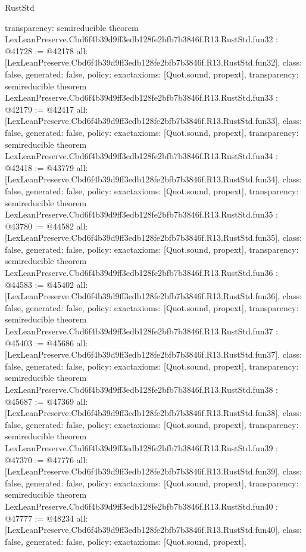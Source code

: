 \begin{lexlean}{RustStd}
\begin{coremodule}
{  transparency: semireducible
}
theorem LexLeanPreserve.Cbd6f4b39d9ff3edb128fe2bfb7b3846f.R13.RustStd.fun32 : @41728 := @42178 {
  all: [LexLeanPreserve.Cbd6f4b39d9ff3edb128fe2bfb7b3846f.R13.RustStd.fun32],
  class: false,
  generated: false,
  policy: exact{axioms: [Quot.sound, propext]},
  transparency: semireducible
}
theorem LexLeanPreserve.Cbd6f4b39d9ff3edb128fe2bfb7b3846f.R13.RustStd.fun33 : @42179 := @42417 {
  all: [LexLeanPreserve.Cbd6f4b39d9ff3edb128fe2bfb7b3846f.R13.RustStd.fun33],
  class: false,
  generated: false,
  policy: exact{axioms: [Quot.sound, propext]},
  transparency: semireducible
}
theorem LexLeanPreserve.Cbd6f4b39d9ff3edb128fe2bfb7b3846f.R13.RustStd.fun34 : @42418 := @43779 {
  all: [LexLeanPreserve.Cbd6f4b39d9ff3edb128fe2bfb7b3846f.R13.RustStd.fun34],
  class: false,
  generated: false,
  policy: exact{axioms: [Quot.sound, propext]},
  transparency: semireducible
}
theorem LexLeanPreserve.Cbd6f4b39d9ff3edb128fe2bfb7b3846f.R13.RustStd.fun35 : @43780 := @44582 {
  all: [LexLeanPreserve.Cbd6f4b39d9ff3edb128fe2bfb7b3846f.R13.RustStd.fun35],
  class: false,
  generated: false,
  policy: exact{axioms: [Quot.sound, propext]},
  transparency: semireducible
}
theorem LexLeanPreserve.Cbd6f4b39d9ff3edb128fe2bfb7b3846f.R13.RustStd.fun36 : @44583 := @45402 {
  all: [LexLeanPreserve.Cbd6f4b39d9ff3edb128fe2bfb7b3846f.R13.RustStd.fun36],
  class: false,
  generated: false,
  policy: exact{axioms: [Quot.sound, propext]},
  transparency: semireducible
}
theorem LexLeanPreserve.Cbd6f4b39d9ff3edb128fe2bfb7b3846f.R13.RustStd.fun37 : @45403 := @45686 {
  all: [LexLeanPreserve.Cbd6f4b39d9ff3edb128fe2bfb7b3846f.R13.RustStd.fun37],
  class: false,
  generated: false,
  policy: exact{axioms: [Quot.sound, propext]},
  transparency: semireducible
}
theorem LexLeanPreserve.Cbd6f4b39d9ff3edb128fe2bfb7b3846f.R13.RustStd.fun38 : @45687 := @47369 {
  all: [LexLeanPreserve.Cbd6f4b39d9ff3edb128fe2bfb7b3846f.R13.RustStd.fun38],
  class: false,
  generated: false,
  policy: exact{axioms: [Quot.sound, propext]},
  transparency: semireducible
}
theorem LexLeanPreserve.Cbd6f4b39d9ff3edb128fe2bfb7b3846f.R13.RustStd.fun39 : @47370 := @47776 {
  all: [LexLeanPreserve.Cbd6f4b39d9ff3edb128fe2bfb7b3846f.R13.RustStd.fun39],
  class: false,
  generated: false,
  policy: exact{axioms: [Quot.sound, propext]},
  transparency: semireducible
}
theorem LexLeanPreserve.Cbd6f4b39d9ff3edb128fe2bfb7b3846f.R13.RustStd.fun40 : @47777 := @48234 {
  all: [LexLeanPreserve.Cbd6f4b39d9ff3edb128fe2bfb7b3846f.R13.RustStd.fun40],
  class: false,
  generated: false,
  policy: exact{axioms: [Quot.sound, propext]},
}
\end{coremodule}
\end{lexlean}
